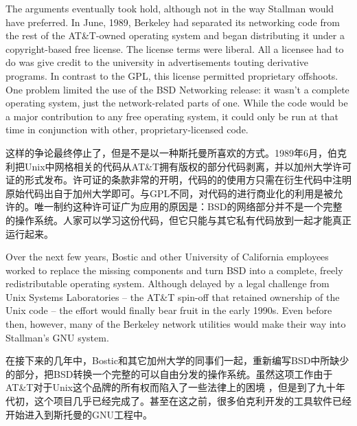 \ifdefined\eng
The arguments eventually took hold, although not in the way Stallman would have preferred. In June, 1989, Berkeley had separated its networking code from the rest of the AT\&T-owned operating system and began distributing it under a copyright-based free license. The license terms were liberal. All a licensee had to do was give credit to the university in advertisements touting derivative programs. In contrast to the GPL, this license permitted proprietary offshoots.  One problem limited the use of the BSD Networking release: it wasn't a complete operating system, just the network-related parts of one.  While the code would be a major contribution to any free operating system, it could only be run at that time in conjunction with other, proprietary-licensed code.
\fi

\ifdefined\chs
这样的争论最终停止了，但是不是以一种斯托曼所喜欢的方式。1989年6月，伯克利把Unix中网格相关的代码从AT\&T拥有版权的部分代码剥离，并以加州大学许可证的形式发布。许可证的条款非常的开明，代码的的使用方只需在衍生代码中注明原始代码出自于加州大学即可。与GPL不同，对代码的进行商业化的利用是被允许的。唯一制约这种许可证广为应用的原因是：BSD的网络部分并不是一个完整的操作系统。人家可以学习这份代码，但它只能与其它私有代码放到一起才能真正运行起来。
\fi

\ifdefined\eng
Over the next few years, Bostic and other University of California employees worked to replace the missing components and turn BSD into a complete, freely redistributable operating system. Although delayed by a legal challenge from Unix Systems Laboratories -- the AT\&T spin-off that retained ownership of the Unix code -- the effort would finally bear fruit in the early 1990s. Even before then, however, many of the Berkeley network utilities would make their way into Stallman's GNU system.
\fi

\ifdefined\chs
在接下来的几年中，Bostic和其它加州大学的同事们一起，重新编写BSD中所缺少的部分，把BSD转换一个完整的可以自由分发的操作系统。虽然这项工作由于AT\&T对于Unix这个品牌的所有权而陷入了一些法律上的困境 ，但是到了九十年代初，这个项目几乎已经完成了。甚至在这之前，很多伯克利开发的工具软件已经开始进入到斯托曼的GNU工程中。
\fi

